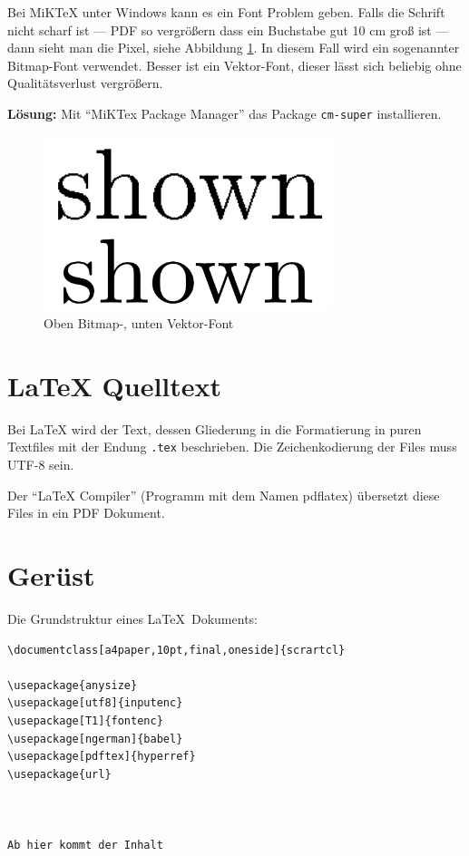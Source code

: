 Bei MiKTeX unter Windows kann es ein Font Problem geben.
Falls die Schrift nicht scharf ist --- PDF so vergrößern dass ein Buchstabe gut 10 cm groß ist --- dann sieht man die Pixel, siehe Abbildung \ref{fig:bitmapfont}.
In diesem Fall wird ein sogenannter Bitmap-Font verwendet. 
Besser ist ein Vektor-Font, dieser lässt sich beliebig ohne Qualitätsverlust vergrößern.

\textbf{Lösung:}
Mit "`MiKTex Package Manager"' das Package \verb+cm-super+ installieren.

\begin{figure}[H]
	\centering
	\includegraphics[width=0.75\textwidth]{./media/images/bitmap_font}
  	\caption{Oben Bitmap-, unten Vektor-Font}
  	\label{fig:bitmapfont}
\end{figure}

\section{LaTeX Quelltext}

Bei LaTeX wird der Text, dessen Gliederung in die Formatierung in puren Textfiles mit der Endung \verb+.tex+ beschrieben.
Die Zeichenkodierung der Files muss UTF-8 sein.

Der "`LaTeX Compiler"' (Programm mit dem Namen pdflatex) übersetzt diese Files in ein PDF Dokument.

\section{Gerüst}

Die Grundstruktur eines \LaTeX\ Dokuments:
\begin{Verbatim}[frame=single]
\documentclass[a4paper,10pt,final,oneside]{scrartcl}	

\usepackage{anysize}
\usepackage[utf8]{inputenc}
\usepackage[T1]{fontenc}
\usepackage[ngerman]{babel}
\usepackage[pdftex]{hyperref}
\usepackage{url}
 


Ab hier kommt der Inhalt


\end{Verbatim}

